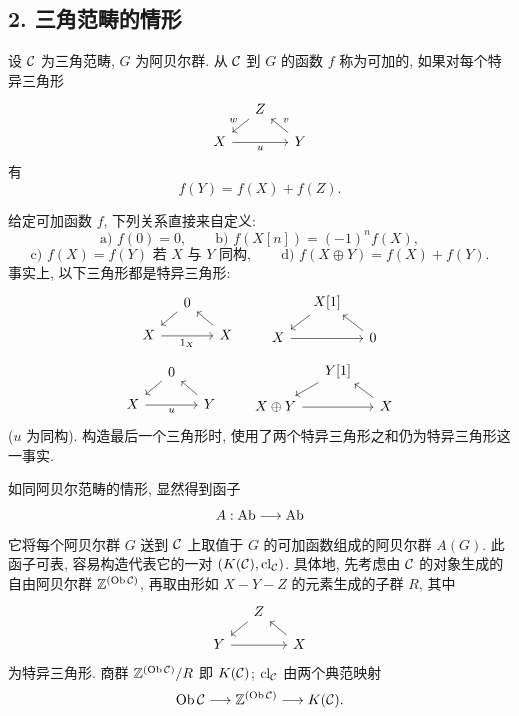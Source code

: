 \subsection*{2. 三角范畴的情形}

设 $\mathcal C$ 为三角范畴, $G$ 为阿贝尔群. 从 $\mathcal C$ 到 $G$ 的函数 $f$ 称为可加的, 如果对每个特异三角形
\[
\begin{tikzcd}[column sep=small,row sep=small]
& Z \arrow[dl,"w"']\\
X \arrow[rr,"u"'] && Y \arrow[ul,"v"']
\end{tikzcd}
\]
有
\[
f(Y)=f(X)+f(Z).
\]

给定可加函数 $f$, 下列关系直接来自定义:
\[
\text{a) } f(0)=0,\qquad
\text{b) } f(X[n])=(-1)^n f(X),
\]
\[
\text{c) } f(X)=f(Y)\text{ 若 }X\text{ 与 }Y\text{ 同构},
\qquad
\text{d) } f(X\oplus Y)=f(X)+f(Y).
\]
事实上, 以下三角形都是特异三角形:
\[
\begin{tikzcd}[column sep=small,row sep=small]
&0 \arrow[dl]\\ X \arrow[rr,"1_X"']&&X\arrow[ul]
\end{tikzcd}
\qquad
\begin{tikzcd}[column sep=small,row sep=small]
&X[1]\arrow[dl]\\ X\arrow[rr]&&0\arrow[ul]
\end{tikzcd}
\]
\[
\begin{tikzcd}[column sep=small,row sep=small]
&0\arrow[dl]\\ X\arrow[rr,"u"']&&Y\arrow[ul]
\end{tikzcd}
\qquad
\begin{tikzcd}[column sep=small,row sep=small]
&Y[1]\arrow[dl]\\ X\oplus Y\arrow[rr]&&X\arrow[ul]
\end{tikzcd}
\]
($u$ 为同构). 构造最后一个三角形时, 使用了两个特异三角形之和仍为特异三角形这一事实.

如同阿贝尔范畴的情形, 显然得到函子
\[
A:\operatorname{Ab}\longrightarrow\operatorname{Ab}
\]
它将每个阿贝尔群 $G$ 送到 $\mathcal C$ 上取值于 $G$ 的可加函数组成的阿贝尔群 $A(G)$. 此函子可表, 容易构造代表它的一对 $(K(\mathcal C),\operatorname{cl}_{\mathcal C})$. 具体地, 先考虑由 $\mathcal C$ 的对象生成的自由阿贝尔群 $\mathbb Z^{(\operatorname{Ob}\mathcal C)}$, 再取由形如 $X-Y-Z$ 的元素生成的子群 $R$, 其中
\[
\begin{tikzcd}[column sep=small,row sep=small]
&Z\arrow[dl]\\ Y\arrow[rr]&&X\arrow[ul]
\end{tikzcd}
\]
为特异三角形. 商群 $\mathbb Z^{(\operatorname{Ob}\mathcal C)}/R$ 即 $K(\mathcal C)$; $\operatorname{cl}_{\mathcal C}$ 由两个典范映射
\[
\operatorname{Ob}\mathcal C\longrightarrow \mathbb Z^{(\operatorname{Ob}\mathcal C)}\longrightarrow K(\mathcal C).
\]

